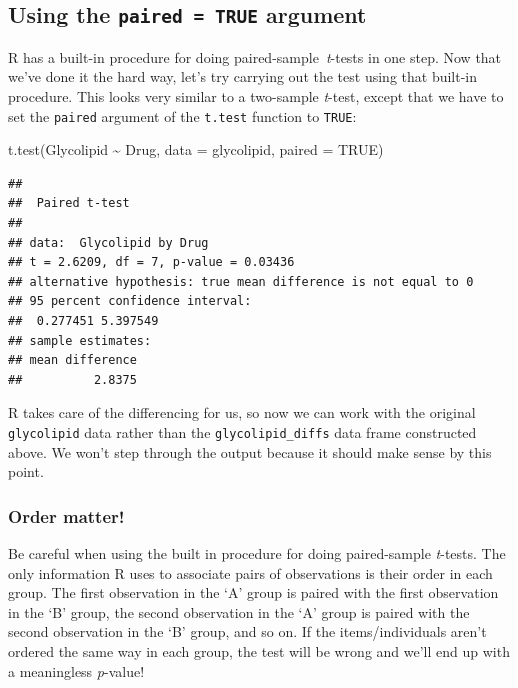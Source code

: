 \documentclass[
]{book}
\newenvironment{Shaded}{\begin{snugshade}}{\end{snugshade}}
\newcommand{\AttributeTok}[1]{\textcolor[rgb]{0.77,0.63,0.00}{#1}}
\newcommand{\ConstantTok}[1]{\textcolor[rgb]{0.00,0.00,0.00}{#1}}
\newcommand{\FunctionTok}[1]{\textcolor[rgb]{0.00,0.00,0.00}{#1}}
\newcommand{\NormalTok}[1]{#1}
\newcommand{\SpecialCharTok}[1]{\textcolor[rgb]{0.00,0.00,0.00}{#1}}
\newenvironment{greybox}{
  \definecolor{shadecolor}{rgb}{0.95,0.95,0.95}  %
  \color{black}
  \begin{shaded}}
 {\end{shaded}}
\newenvironment{infobox}[1]
  {
  \begin{itemize}
  \renewcommand{\labelitemi}{
    \raisebox{-.7\height}[0pt][0pt]{
      {\setkeys{Gin}{width=3em,keepaspectratio}
        \texttt{[image: images/\#1]}}
    }
  }
  \setlength{\fboxsep}{1em}
  \begin{greybox}
  \item
  }
  {
  \end{greybox}
  \end{itemize}
  }
\begin{document}
\hypertarget{using-the-paired-true-argument}{%
\subsection{\texorpdfstring{Using the \texttt{paired\ =\ TRUE} argument}{Using the paired = TRUE argument}}\label{using-the-paired-true-argument}}

R has a built-in procedure for doing paired-sample~\emph{t}-tests in one step. Now that we've done it the hard way, let's try carrying out the test using that built-in procedure. This looks very similar to a two-sample \emph{t}-test, except that we have to set the \texttt{paired} argument of the \texttt{t.test} function to \texttt{TRUE}:

\begin{Shaded}
\begin{Highlighting}[]
\FunctionTok{t.test}\NormalTok{(Glycolipid }\SpecialCharTok{\textasciitilde{}}\NormalTok{ Drug, }\AttributeTok{data =}\NormalTok{ glycolipid, }\AttributeTok{paired =} \ConstantTok{TRUE}\NormalTok{)}
\end{Highlighting}
\end{Shaded}

\begin{verbatim}
## 
##  Paired t-test
## 
## data:  Glycolipid by Drug
## t = 2.6209, df = 7, p-value = 0.03436
## alternative hypothesis: true mean difference is not equal to 0
## 95 percent confidence interval:
##  0.277451 5.397549
## sample estimates:
## mean difference 
##          2.8375
\end{verbatim}

R takes care of the differencing for us, so now we can work with the original \texttt{glycolipid} data rather than the \texttt{glycolipid\_diffs} data frame constructed above. We won't step through the output because it should make sense by this point.

\begin{infobox}{action}

\hypertarget{order-matter}{%
\subsubsection*{Order matter!}\label{order-matter}}

Be careful when using the built in procedure for doing paired-sample \emph{t}-tests. The only information R uses to associate pairs of observations is their order in each group. The first observation in the `A' group is paired with the first observation in the `B' group, the second observation in the `A' group is paired with the second observation in the `B' group, and so on. If the items/individuals aren't ordered the same way in each group, the test will be wrong and we'll end up with a meaningless \emph{p}-value!

\end{infobox}
\end{document}
